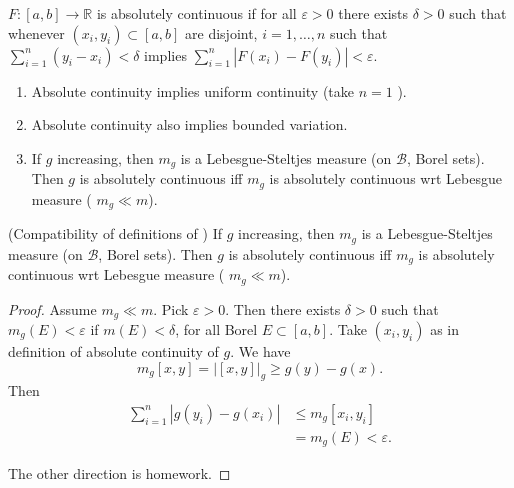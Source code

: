 \begin{definition}
	$F: [a,b] \to \mathbb{R}$ is absolutely continuous if for all $\varepsilon>0$ there exists $\delta>0$ such that whenever $(x_i, y_i) \subset [a,b]$ are disjoint, $i = 1, \ldots, n$ such that $\sum_{i=1}^{n} (y_i - x_i) < \delta $ implies $\sum_{i=1}^{n} |F(x_i) - F(y_i)| < \varepsilon$.
\end{definition}
\begin{remark}
	\begin{enumerate}
		\item 
	Absolute continuity implies uniform continuity (take $n = 1$ ).
\item Absolute continuity also implies bounded variation.
\item If $g$ increasing, then $m_g$ is a Lebesgue-Steltjes measure (on $\mathcal{B}$, Borel sets). Then $g$ is absolutely continuous iff $m_g$ is absolutely continuous wrt Lebesgue measure ( $m_g \ll m$).
	\end{enumerate}
\end{remark}

\begin{proposition}(Compatibility of definitions of )
If $g$ increasing, then $m_g$ is a Lebesgue-Steltjes measure (on $\mathcal{B}$, Borel sets). Then $g$ is absolutely continuous iff $m_g$ is absolutely continuous wrt Lebesgue measure ( $m_g \ll m$).
\end{proposition}
\begin{proof}
	Assume $m_g \ll m$. Pick $\varepsilon>0$. Then there exists $\delta>0$ such that $m_g(E) < \varepsilon$ if $m(E) < \delta$, for all Borel  $E \subset [a,b]$. Take $(x_i, y_i)$ as in definition of absolute continuity of $g$. 
	We have 
	\[
		m_g [x,y] = |[x,y]|_g \ge  g(y) - g(x)
	.\] 
	Then
		\begin{align*}
			\sum_{i=1}^{n} |g(y_i) - g(x_i)| 
			&\le m_g[x_i, y_i] \\
			&= m_g(E) < \varepsilon
		.\end{align*}

	The other direction is homework.
\end{proof}

